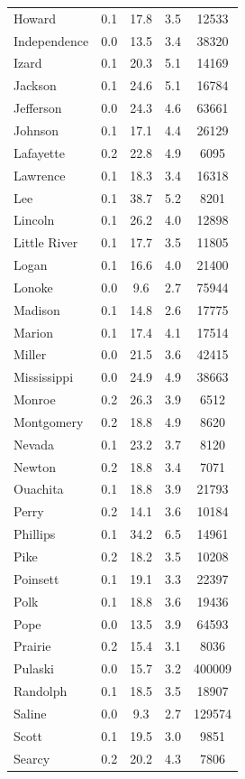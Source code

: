 \begin{table}
\begin{tabular}{lcccc}
Howard & 0.1 & 17.8 & 3.5 & 12533 \\
Independence & 0.0 & 13.5 & 3.4 & 38320 \\
Izard & 0.1 & 20.3 & 5.1 & 14169 \\
Jackson & 0.1 & 24.6 & 5.1 & 16784 \\
Jefferson & 0.0 & 24.3 & 4.6 & 63661 \\
Johnson & 0.1 & 17.1 & 4.4 & 26129 \\
Lafayette & 0.2 & 22.8 & 4.9 & 6095 \\
Lawrence & 0.1 & 18.3 & 3.4 & 16318 \\
Lee & 0.1 & 38.7 & 5.2 & 8201 \\
Lincoln & 0.1 & 26.2 & 4.0 & 12898 \\
Little River & 0.1 & 17.7 & 3.5 & 11805 \\
Logan & 0.1 & 16.6 & 4.0 & 21400 \\
Lonoke & 0.0 & 9.6 & 2.7 & 75944 \\
Madison & 0.1 & 14.8 & 2.6 & 17775 \\
Marion & 0.1 & 17.4 & 4.1 & 17514 \\
Miller & 0.0 & 21.5 & 3.6 & 42415 \\
Mississippi & 0.0 & 24.9 & 4.9 & 38663 \\
Monroe & 0.2 & 26.3 & 3.9 & 6512 \\
Montgomery & 0.2 & 18.8 & 4.9 & 8620 \\
Nevada & 0.1 & 23.2 & 3.7 & 8120 \\
Newton & 0.2 & 18.8 & 3.4 & 7071 \\
Ouachita & 0.1 & 18.8 & 3.9 & 21793 \\
Perry & 0.2 & 14.1 & 3.6 & 10184 \\
Phillips & 0.1 & 34.2 & 6.5 & 14961 \\
Pike & 0.2 & 18.2 & 3.5 & 10208 \\
Poinsett & 0.1 & 19.1 & 3.3 & 22397 \\
Polk & 0.1 & 18.8 & 3.6 & 19436 \\
Pope & 0.0 & 13.5 & 3.9 & 64593 \\
Prairie & 0.2 & 15.4 & 3.1 & 8036 \\
Pulaski & 0.0 & 15.7 & 3.2 & 400009 \\
Randolph & 0.1 & 18.5 & 3.5 & 18907 \\
Saline & 0.0 & 9.3 & 2.7 & 129574 \\
Scott & 0.1 & 19.5 & 3.0 & 9851 \\
Searcy & 0.2 & 20.2 & 4.3 & 7806 \\

\end{tabular}
\end{table}
